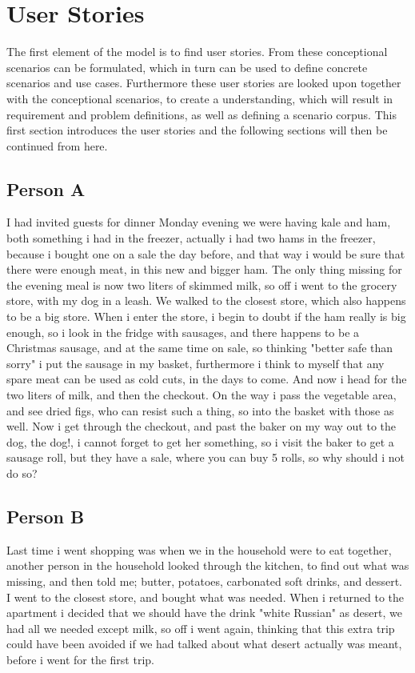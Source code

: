 \section{User Stories} \label{UserStories}
The first element of the model is to find user stories. From these conceptional scenarios can be formulated, which in turn can be used to define concrete scenarios and use cases. Furthermore these user stories are looked upon together with the conceptional scenarios, to create a understanding, which will result in requirement and problem definitions, as well as defining a scenario corpus. This first section introduces the user stories and the following sections will then be continued from here. 

\subsection{Person A}
I had invited guests for dinner Monday evening we were having kale and ham, both something i had in the freezer, actually i had two hams in the freezer, because i bought one on a sale the day before, and that way i would be sure that there were enough meat, in this new and bigger ham. The only thing missing for the evening meal is now two liters of skimmed milk, so off i went to the grocery store, with my dog in a leash. We walked to the closest store, which also happens to be a big store. When i enter the store, i begin to doubt if the ham really is big enough, so i look in the fridge with sausages, and there happens to be a Christmas sausage, and at the same time on sale, so thinking "better safe than sorry" i put the sausage in my basket, furthermore i think to myself that any spare meat can be used as cold cuts, in the days to come. And now i head for the two liters of milk, and then the checkout. On the way i pass the vegetable area, and see dried figs, who can resist such a thing, so into the basket with those as well. Now i get through the checkout, and past the baker on my way out to the dog, the dog!, i cannot forget to get her something, so i visit the baker to get a sausage roll, but they have a sale, where you can buy 5 rolls, so why should i not do so?

\subsection{Person B}
Last time i went shopping was when we in the household were to eat together, another person in the household looked through the kitchen, to find out what was missing, and then told me; butter, potatoes, carbonated soft drinks, and dessert. I went to the closest store, and bought what was needed. When i returned to the apartment i decided that we should have the drink "white Russian" as desert, we had all we needed except milk, so off i went again, thinking that this extra trip could have been avoided if we had talked about what desert actually was meant, before i went for the first trip.
 

